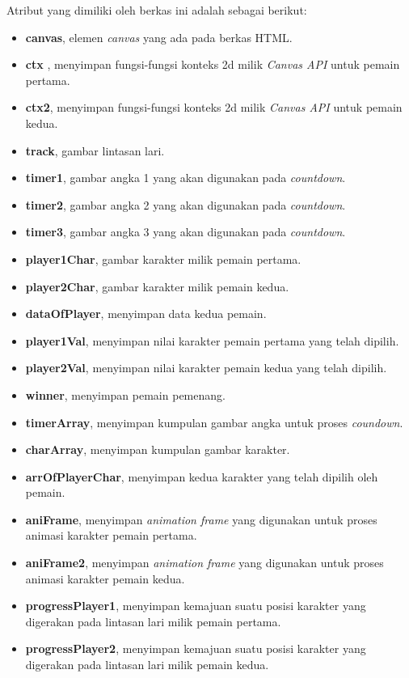 \begin{enumerate}
\begin{enumerate}
\begin{enumerate}
			Atribut yang dimiliki oleh berkas ini adalah sebagai berikut:
			\begin{itemize}
				\item \textbf{canvas}, elemen \textit{canvas} yang ada pada berkas HTML.
				\item \textbf{ctx} , menyimpan fungsi-fungsi konteks 2d milik \textit{Canvas API} untuk pemain pertama.
				\item \textbf{ctx2}, menyimpan fungsi-fungsi konteks 2d milik \textit{Canvas API} untuk pemain kedua.
				\item \textbf{track}, gambar lintasan lari.
				\item \textbf{timer1}, gambar angka 1 yang akan digunakan pada \textit{countdown}.
				\item \textbf{timer2}, gambar angka 2 yang akan digunakan pada \textit{countdown}.
				\item \textbf{timer3}, gambar angka 3 yang akan digunakan pada \textit{countdown}.
				\item \textbf{player1Char},  gambar karakter milik pemain pertama.
				\item \textbf{player2Char}, gambar karakter milik pemain kedua.
				\item \textbf{dataOfPlayer}, menyimpan data kedua pemain.
				\item \textbf{player1Val}, menyimpan nilai karakter pemain pertama yang telah dipilih.
				\item \textbf{player2Val}, menyimpan nilai karakter pemain kedua yang telah dipilih.
				\item \textbf{winner}, menyimpan pemain pemenang.
				\item \textbf{timerArray}, menyimpan kumpulan gambar angka untuk proses \textit{coundown}.
				\item \textbf{charArray}, menyimpan kumpulan gambar karakter.
				\item \textbf{arrOfPlayerChar}, menyimpan kedua karakter yang telah dipilih oleh pemain.
				\item \textbf{aniFrame}, menyimpan \textit{animation frame} yang digunakan untuk proses animasi karakter pemain pertama.
				\item \textbf{aniFrame2}, menyimpan \textit{animation frame} yang digunakan untuk proses animasi karakter pemain kedua.
				\item \textbf{progressPlayer1}, menyimpan kemajuan suatu posisi karakter yang digerakan pada lintasan lari milik pemain pertama.
				\item \textbf{progressPlayer2}, menyimpan kemajuan suatu posisi karakter yang digerakan pada lintasan lari milik pemain kedua.

\end{itemize}
\end{enumerate}
\end{enumerate}
\end{enumerate}

